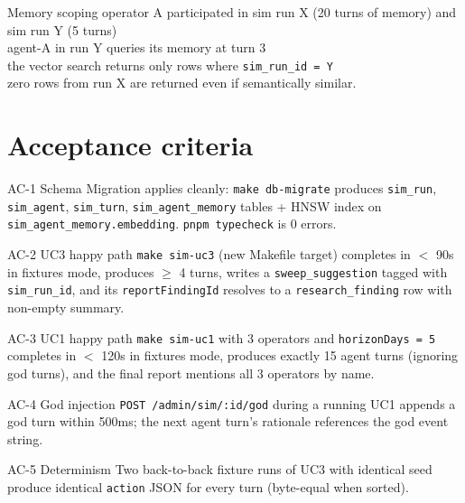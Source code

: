 \begin{scenario}{Memory scoping}
\Given operator A participated in sim run X (20 turns of memory) and sim run Y (5 turns) \\
\When agent-A in run Y queries its memory at turn 3 \\
\Then the vector search returns only rows where \texttt{sim\_run\_id = Y} \\
\And zero rows from run X are returned even if semantically similar.
\end{scenario}

\section{Acceptance criteria}

\begin{ac}{AC-1 Schema}
Migration applies cleanly: \texttt{make db-migrate} produces \texttt{sim\_run}, \texttt{sim\_agent}, \texttt{sim\_turn}, \texttt{sim\_agent\_memory} tables + HNSW index on \texttt{sim\_agent\_memory.embedding}. \texttt{pnpm typecheck} is 0 errors.
\end{ac}

\begin{ac}{AC-2 UC3 happy path}
\texttt{make sim-uc3} (new Makefile target) completes in $<$ 90s in fixtures mode, produces $\geq$ 4 turns, writes a \texttt{sweep\_suggestion} tagged with \texttt{sim\_run\_id}, and its \texttt{reportFindingId} resolves to a \texttt{research\_finding} row with non-empty summary.
\end{ac}

\begin{ac}{AC-3 UC1 happy path}
\texttt{make sim-uc1} with 3 operators and \texttt{horizonDays = 5} completes in $<$ 120s in fixtures mode, produces exactly 15 agent turns (ignoring god turns), and the final report mentions all 3 operators by name.
\end{ac}

\begin{ac}{AC-4 God injection}
\texttt{POST /admin/sim/:id/god} during a running UC1 appends a god turn within 500ms; the next agent turn's rationale references the god event string.
\end{ac}

\begin{ac}{AC-5 Determinism}
Two back-to-back fixture runs of UC3 with identical seed produce identical \texttt{action} JSON for every turn (byte-equal when sorted).
\end{ac}

